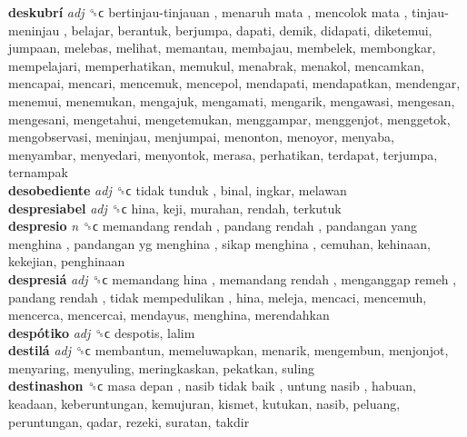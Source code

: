 \textbf{deskubrí} \emph{adj}  ␝ϲ   bertinjau-tinjauan ,  menaruh mata ,  mencolok mata ,  tinjau-meninjau , belajar, berantuk, berjumpa, dapati, demik, didapati, diketemui, jumpaan, melebas, melihat, memantau, membajau, membelek, membongkar, mempelajari, memperhatikan, memukul, menabrak, menakol, mencamkan, mencapai, mencari, mencemuk, mencepol, mendapati, mendapatkan, mendengar, menemui, menemukan, mengajuk, mengamati, mengarik, mengawasi, mengesan, mengesani, mengetahui, mengetemukan, menggampar, menggenjot, menggetok, mengobservasi, meninjau, menjumpai, menonton, menoyor, menyaba, menyambar, menyedari, menyontok, merasa, perhatikan, terdapat, terjumpa, ternampak  \\
\textbf{desobediente} \emph{adj}  ␝ϲ   tidak tunduk , binal, ingkar, melawan  \\
\textbf{despresiabel} \emph{adj}  ␝ϲ  hina, keji, murahan, rendah, terkutuk  \\
\textbf{despresio} \emph{n}  ␝ϲ   memandang rendah ,  pandang rendah ,  pandangan yang menghina ,  pandangan yg menghina ,  sikap menghina , cemuhan, kehinaan, kekejian, penghinaan  \\
\textbf{despresiá} \emph{adj}  ␝ϲ   memandang hina ,  memandang rendah ,  menganggap remeh ,  pandang rendah ,  tidak mempedulikan , hina, meleja, mencaci, mencemuh, mencerca, mencercai, mendayus, menghina, merendahkan  \\
\textbf{despótiko} \emph{adj}  ␝ϲ  despotis, lalim  \\
\textbf{destilá} \emph{adj}  ␝ϲ  membantun, memeluwapkan, menarik, mengembun, menjonjot, menyaring, menyuling, meringkaskan, pekatkan, suling  \\
\textbf{destinashon} ␝ϲ   masa depan ,  nasib tidak baik ,  untung nasib , habuan, keadaan, keberuntungan, kemujuran, kismet, kutukan, nasib, peluang, peruntungan, qadar, rezeki, suratan, takdir  \\
